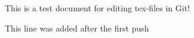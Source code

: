 \documentclass[10pt,conference]{IEEEtran}
\begin{document}
This is a test document for editing tex-files in Git!

This line was added after the first push
\end{document}
